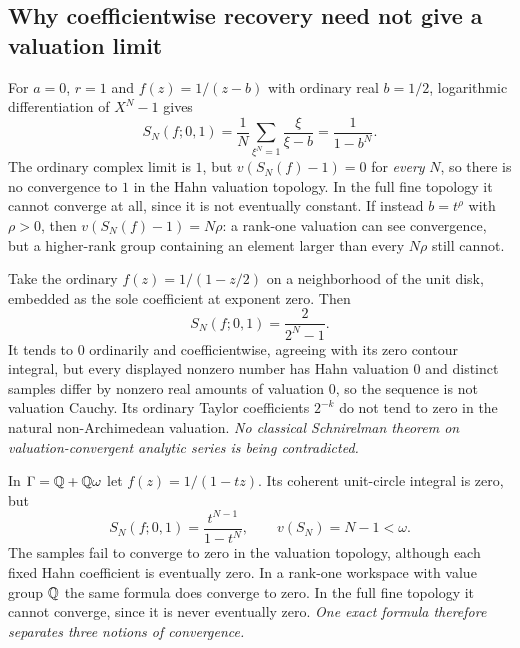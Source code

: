 \documentclass[11pt,letterpaper]{article}
\theoremstyle{definition}
\theoremstyle{remark}
\numberwithin{equation}{section}
\begin{document}
\subsection{Why coefficientwise recovery need not give a valuation limit}
\begin{example}
\label{contours:ex:quadrature}
For $a=0$, $r=1$ and $f(z)=1/(z-b)$ with ordinary real $b=1/2$, logarithmic
differentiation of $X^N-1$ gives
\[
  S_N(f;0,1)=\frac1N\sum_{\xi^N=1}\frac{\xi}{\xi-b}=\frac1{1-b^N} .
\]
The ordinary complex limit is $1$, but $v(S_N(f)-1)=0$ for \emph{every} $N$, so
there is no convergence to $1$ in the Hahn valuation topology. In the full fine
topology it cannot converge at all, since it is not eventually constant. If instead
$b=t^\rho$ with $\rho>0$, then $v(S_N(f)-1)=N\rho$: a rank-one valuation can see
convergence, but a higher-rank group containing an element larger than every $N\rho$
still cannot.
\end{example}

\begin{example}
\label{contours:ex:ordinarysampling}
Take the ordinary $f(z)=1/(1-z/2)$ on a neighborhood of the unit disk, embedded as
the sole coefficient at exponent zero. Then
\begin{equation}\label{contours:eq:ordinarysample}
  S_N(f;0,1)=\frac{2}{2^N-1}.
\end{equation}
It tends to $0$ ordinarily and coefficientwise, agreeing with its zero contour
integral, but every displayed nonzero number has Hahn valuation $0$ and distinct
samples differ by nonzero real amounts of valuation $0$, so the sequence is not
valuation Cauchy. Its ordinary Taylor coefficients $2^{-k}$ do not tend to zero in
the natural non-Archimedean valuation. \emph{No classical Schnirelman theorem on
valuation-convergent analytic series is being contradicted.}
\end{example}

\begin{example}
\label{contours:ex:highranksampling}
In $\Gamma=\mathbb Q+\mathbb Q\omega$ let $f(z)=1/(1-tz)$. Its coherent unit-circle integral is
zero, but
\begin{equation}\label{contours:eq:highranksample}
  S_N(f;0,1)=\frac{t^{N-1}}{1-t^N},\qquad v(S_N)=N-1<\omega .
\end{equation}
The samples fail to converge to zero in the valuation topology, although each fixed
Hahn coefficient is eventually zero. In a rank-one workspace with value group $\mathbb Q$
the same formula does converge to zero. In the full fine topology it cannot
converge, since it is never eventually zero. \emph{One exact formula therefore
separates three notions of convergence.}
\end{example}
\end{document}
